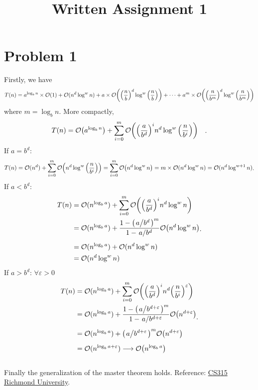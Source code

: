 \documentclass{article}
\begin{document}
\title{Written Assignment 1}
\maketitle
\section*{Problem 1}
Firstly, we have
\[
	\begin{aligned}
		T(n)=a^{\log_bn}\times\mathcal{O}(1)+
		\mathcal{O}(n^d\log^wn)+
		a\times\mathcal{O}\qty(\qty(\frac{n}{b})^d\log^w\qty(\frac{n}{b}))
		+\cdots+
		a^m\times\mathcal{O}\qty(\qty(\frac{n}{b^m})^d\log^w\qty(\frac{n}{b^m}))
	\end{aligned}
\] where $m=\log_b n$.
More compactly,
\[
	\begin{aligned}
		T(n)
		&=\mathcal{O}\qty(a^{\log_bn})+
		\sum_{i=0}^m
		\mathcal{O}\qty(\qty(\frac{a}{b^d})^in^d\log^w\qty(\frac{n}{b^i}))
	\end{aligned}
.\] 
 If $a=b^d$:
 \[
	 \begin{aligned}
		 T(n)
		 =\mathcal{O}(n^d)+\sum_{i=0}^m
		 \mathcal{O}\qty(n^d\log^w\qty(\frac{n}{b^i}))
		 =
		 \sum_{i=0}^m\mathcal{O}\qty(n^d\log^wn)
		 =
		 m\times\mathcal{O}(n^d\log^{w}n)
		 =
		 \mathcal{O}(n^d\log^{w+1}n)
	 \end{aligned}
.\] 
 If $a<b^d$:
 \[
	 \begin{aligned}
		 T(n)
		 &=
		 \+O(n^{\log_ba})+
		 \sum_{i=0}^m
		 \+O\qty(\qty(\frac{a}{b^d})^in^d\log^wn)
		 \\&=
		 \+O(n^{\log_ba})+
		 \frac{1-\qty(\flatfrac{a}{b^d})^m}
		 {1-\flatfrac{a}{b^d}}
		 \+O\qty(n^d\log^wn)
		 \\[5pt]&=
		 \+O(n^{\log_ba})+\+O(n^d\log^wn)
		 \\&=
		 \+O(n^d\log^wn)
	 \end{aligned}
.\] 
 If $a>b^d$: $\forall \varepsilon>0$
\[
	\begin{aligned}
		T(n)&=
		\+O(n^{\log_ba})+
		\sum_{i=0}^m\+O\qty(\qty(\frac{a}{b^d})^in^d\qty(\frac{n}{b^i})^\varepsilon)
		\\&=\+O(n^{\log_ba})+
		\frac{1-\qty(\flatfrac{a}{b^{d+\varepsilon}})^m}
		{1-\flatfrac{a}{b^{d+\varepsilon}}}\+O\qty(n^{d+\varepsilon})
		\\[5pt]&=
		\+O(n^{\log_ba})+
		\qty(\flatfrac{a}{b^{d+\varepsilon}})^m\+O\qty(n^{d+\varepsilon})
		\\[5pt]&=\+O(n^{\log_ba+\varepsilon})
		\longrightarrow\+O\qty(n^{\log_ba})
	\end{aligned}
.\]
\\
Finally the generalization of the master theorem holds.
Reference: \href{https://facultystaff.richmond.edu/~dszajda/classes/cs315/Spring_2020/lectures/Divide-and_conquer2020.pdf}{CS315 Richmond University}.
\newpage
\end{document}

